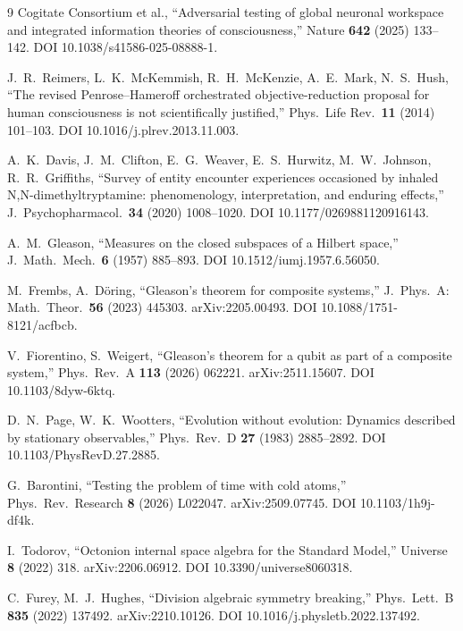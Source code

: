 \begin{thebibliography}{9}
Cogitate Consortium et al., ``Adversarial testing of global neuronal
workspace and integrated information theories of consciousness,''
Nature \textbf{642} (2025) 133--142.
DOI 10.1038/s41586-025-08888-1.

J.~R.~Reimers, L.~K.~McKemmish, R.~H.~McKenzie, A.~E.~Mark, N.~S.~Hush,
``The revised Penrose--Hameroff orchestrated objective-reduction proposal
for human consciousness is not scientifically justified,'' Phys.\ Life Rev.\
\textbf{11} (2014) 101--103. DOI 10.1016/j.plrev.2013.11.003.

A.~K.~Davis, J.~M.~Clifton, E.~G.~Weaver, E.~S.~Hurwitz,
M.~W.~Johnson, R.~R.~Griffiths, ``Survey of entity encounter experiences
occasioned by inhaled N,N-dimethyltryptamine: phenomenology,
interpretation, and enduring effects,'' J.\ Psychopharmacol.\
\textbf{34} (2020) 1008--1020. DOI 10.1177/0269881120916143.

A.~M.~Gleason, ``Measures on the closed subspaces of a Hilbert space,''
J.\ Math.\ Mech.\ \textbf{6} (1957) 885--893.
DOI 10.1512/iumj.1957.6.56050.

M.~Frembs, A.~D\"oring, ``Gleason's theorem for composite systems,''
J.\ Phys.\ A: Math.\ Theor.\ \textbf{56} (2023) 445303.
arXiv:2205.00493. DOI 10.1088/1751-8121/acfbcb.

V.~Fiorentino, S.~Weigert, ``Gleason's theorem for a qubit as part of a
composite system,'' Phys.\ Rev.\ A \textbf{113} (2026) 062221.
arXiv:2511.15607. DOI 10.1103/8dyw-6ktq.

D.~N.~Page, W.~K.~Wootters, ``Evolution without evolution: Dynamics
described by stationary observables,'' Phys.\ Rev.\ D \textbf{27} (1983)
2885--2892. DOI 10.1103/PhysRevD.27.2885.

G.~Barontini, ``Testing the problem of time with cold atoms,''
Phys.\ Rev.\ Research \textbf{8} (2026) L022047.
arXiv:2509.07745. DOI 10.1103/1h9j-df4k.

I.~Todorov, ``Octonion internal space algebra for the Standard Model,''
Universe \textbf{8} (2022) 318. arXiv:2206.06912.
DOI 10.3390/universe8060318.

C.~Furey, M.~J.~Hughes, ``Division algebraic symmetry breaking,''
Phys.\ Lett.\ B \textbf{835} (2022) 137492.
arXiv:2210.10126. DOI 10.1016/j.physletb.2022.137492.

\end{thebibliography}
